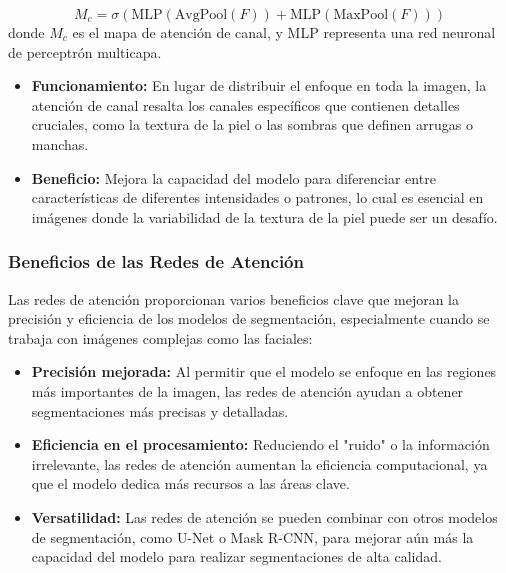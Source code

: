 \begin{equation}\label{eq:mapa_atencion_canal}
    M_c = \sigma(\text{MLP}(\text{AvgPool}(F)) + \text{MLP}(\text{MaxPool}(F)))
\end{equation}
donde $M_c$ es el mapa de atención de canal, y MLP representa una red neuronal de perceptrón multicapa.


\begin{itemize}
    \item \textbf{Funcionamiento:} En lugar de distribuir el enfoque en toda la imagen, la atención de canal resalta los canales específicos que contienen detalles cruciales, como la textura de la piel o las sombras que definen arrugas o manchas.
    \item \textbf{Beneficio:} Mejora la capacidad del modelo para diferenciar entre características de diferentes intensidades o patrones, lo cual es esencial en imágenes donde la variabilidad de la textura de la piel puede ser un desafío. \parencite{autor2019canal}
\end{itemize}

\subsubsection{Beneficios de las Redes de Atención}  
Las redes de atención proporcionan varios beneficios clave que mejoran la precisión y eficiencia de los modelos de segmentación, especialmente cuando se trabaja con imágenes complejas como las faciales:
\begin{itemize}
    \item \textbf{Precisión mejorada:} Al permitir que el modelo se enfoque en las regiones más importantes de la imagen, las redes de atención ayudan a obtener segmentaciones más precisas y detalladas.
    \item \textbf{Eficiencia en el procesamiento:} Reduciendo el "ruido" o la información irrelevante, las redes de atención aumentan la eficiencia computacional, ya que el modelo dedica más recursos a las áreas clave.
    \item \textbf{Versatilidad:} Las redes de atención se pueden combinar con otros modelos de segmentación, como U-Net o Mask R-CNN, para mejorar aún más la capacidad del modelo para realizar segmentaciones de alta calidad. \parencite{autor2021beneficios}
\end{itemize}

